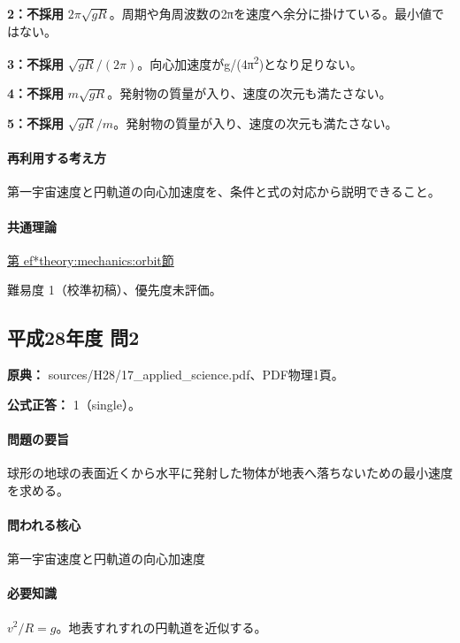 \noindent\textbf{2：不採用} \(2\pi\sqrt{gR}\)。周期や角周波数の2πを速度へ余分に掛けている。最小値ではない。\par

\noindent\textbf{3：不採用} \(\sqrt{gR}/(2\pi)\)。向心加速度がg/(4π\textsuperscript{2})となり足りない。\par

\noindent\textbf{4：不採用} \(m\sqrt{gR}\)。発射物の質量が入り、速度の次元も満たさない。\par

\noindent\textbf{5：不採用} \(\sqrt{gR}/m\)。発射物の質量が入り、速度の次元も満たさない。\par

\paragraph{再利用する考え方} 第一宇宙速度と円軌道の向心加速度を、条件と式の対応から説明できること。

\paragraph{共通理論} \hyperref[theory:mechanics:orbit]{第
ef*{theory:mechanics:orbit}節}

\par 難易度 1（校準初稿）、優先度未評価。

\subsection{平成28年度 問2}
\label{q:h28-reg-applied-02}

\noindent\textbf{原典：} sources/H28/17\_applied\_science.pdf、PDF物理1頁。

\textbf{公式正答：} 1（single）。

\paragraph{問題の要旨} 球形の地球の表面近くから水平に発射した物体が地表へ落ちないための最小速度を求める。

\paragraph{問われる核心} 第一宇宙速度と円軌道の向心加速度

\paragraph{必要知識} \(v^2/R=g\)。地表すれすれの円軌道を近似する。

